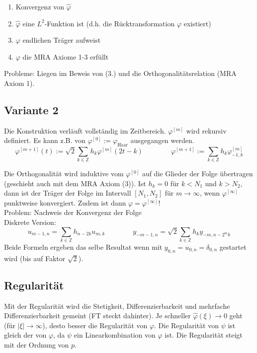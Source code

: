 \vspace{-0.4cm}

\begin{enumerate}
	\itemsep-0.2cm
	\item Konvergenz von $\hat{\varphi}$
	\item $\hat{\varphi}$ eine $L^2$-Funktion ist (d.h. die Rücktransformation $\varphi$ existiert)
	\item $\varphi$ endlichen Träger aufweist
	\item $\varphi$ die MRA Axiome 1-3 erfüllt
\end{enumerate}
Probleme: Liegen im Beweis von (3.) und die Orthogonalitätsrelation (MRA Axiom 1).


\subsection{Variante 2}
Die Konstruktion verläuft vollständig im Zeitbereich. $\varphi^{[m]}$ wird rekursiv definiert. Es kann z.B. von $\varphi^{[0]}:=\varphi_{\text{Haar}}$ ausgegangen werden.
\[ 
	\varphi^{[m+1]}(t) := \sqrt{2} \sum_{k \in \mathbb{Z}} h_k \varphi^{[m]}(2t-k) 
	\qquad \qquad
	\varphi^{[m+1]} := \sum_{k \in \mathbb{Z}} h_k \varphi^{[m]}_{-1,k} 
\]

Die Orthogonalität wird induktive vom $\varphi^{[0]}$ auf die Glieder der Folge übertragen (geschieht auch mit dem MRA Axiom (3)).
Ist $h_k=0$ für $k<N_1$ und $k>N_2$, dann ist der Träger der Folge im Intervall $[N_1,N_2]$ für $m\rightarrow\infty$, wenn $\varphi^{[\infty]}$ punktweise konvergiert. Zudem ist dann $\varphi = \varphi^{[\infty]}$!\\

Problem: Nachweis der Konvergenz der Folge\\

Diskrete Version:
\[ 
	u_{m-1,n} = \sum_{k \in \mathbb{Z}} h_{n-2k}u_{m,k}
	\qquad \qquad
	y_{-m-1,n}=\sqrt{2} \sum_{k \in \mathbb{Z}} h_k y_{-m,n-2^mk}
\]
Beide Formeln ergeben das selbe Resultat wenn mit $y_{0,n}=u_{0,n}=\delta_{0,n}$ gestartet wird (bis auf Faktor $\sqrt{2}$).

\newpage
\subsection{Regularität}
Mit der Regularität wird  die Stetigkeit, Differenzierbarkeit und mehrfache Differenzierbarkeit gemeint (FT steckt dahinter).
Je schneller $\hat{\varphi}(\xi) \rightarrow 0$ geht (für $|\xi| \rightarrow \infty$), desto besser die Regularität von $\varphi$. Die Regularität von $\psi$ ist gleich der von $\varphi$, da $\psi$ ein Linearkombination von $\varphi$ ist. Die Regularität steigt mit der Ordnung von $p$.\\

